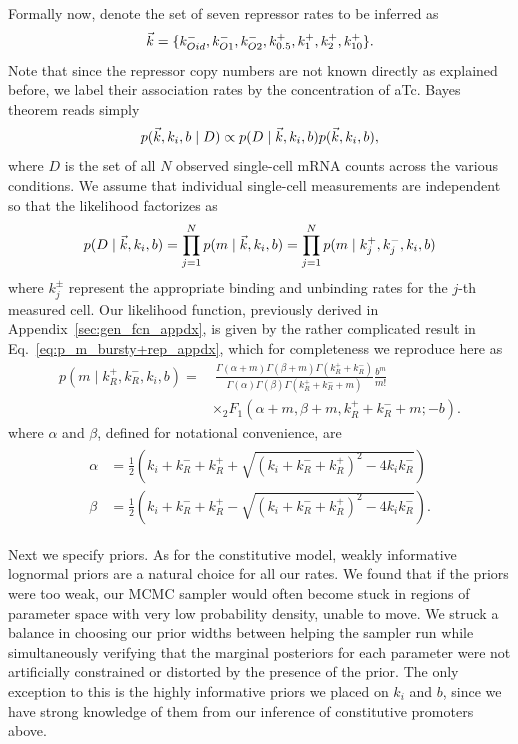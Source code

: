 Formally now, denote the set of seven repressor rates to be inferred as
\begin{equation}
\vec{k} =\{k_{Oid}^-, k_{O1}^-, k_{O2}^-,
k_{0.5}^+, k_{1}^+, k_{2}^+, k_{10}^+\}.
\end{equation}
Note that since the repressor copy numbers are not known directly as explained
before, we label their association rates by the concentration of aTc. Bayes
theorem reads simply
\begin{equation}
p(\vec{k}, k_i, b \mid D)
\propto
p(D \mid\vec{k}, k_i, b) p(\vec{k}, k_i, b),
\end{equation}
where $D$ is the set of all $N$ observed single-cell mRNA counts across the
various conditions. We assume that individual single-cell measurements are
independent so that the likelihood factorizes as
\begin{equation}
p(D \mid\vec{k}, k_i, b)
= \prod_{j=1}^N p(m\mid \vec{k}, k_i, b)
= \prod_{j=1}^N p(m\mid k_j^+, k_j^-, k_i, b)
\end{equation}
where $k_j^\pm$ represent the appropriate binding and unbinding rates for the
$j$-th measured cell. Our likelihood function, previously derived in
Appendix~\ref{sec:gen_fcn_appdx}, is given by the rather complicated result in
Eq.~\ref{eq:p_m_bursty+rep_appdx}, which for completeness we reproduce here as
\begin{equation}
\begin{split}
p(m \mid k_R^+, k_R^-, k_i, b) = & ~\frac{
        \Gamma(\alpha + m)\Gamma(\beta + m)\Gamma(k_R^+ + k_R^-)
        }
        {
        \Gamma(\alpha)\Gamma(\beta)\Gamma(k_R^+ + k_R^- + m)
        }
\frac{b^m}{m!}
\\
&\times {_2F_1}(\alpha+m, \beta+m, k_R^++k_R^-+m; -b).
\end{split}
\label{eq:p_m_bursty+rep_infreprint}
\end{equation}
where $\alpha$ and $\beta$, defined for notational convenience, are
\begin{align}
\begin{split}
\alpha &= \frac{1}{2}
\left(k_i+k_R^-+k_R^+ + \sqrt{(k_i+k_R^-+k_R^+)^2 - 4k_i k_R^-}\right)
\\
\beta &= \frac{1}{2}
\left(k_i+k_R^-+k_R^+ - \sqrt{(k_i+k_R^-+k_R^+)^2 - 4k_i k_R^-}\right).
\end{split}
\end{align}

Next we specify priors. As for the constitutive model, weakly informative
lognormal priors are a natural choice for all our rates. We found that if the
priors were too weak, our MCMC sampler would often become stuck in regions of
parameter space with very low probability density, unable to move. We struck a
balance in choosing our prior widths between helping the sampler run while
simultaneously verifying that the marginal posteriors for each parameter were
not artificially constrained or distorted by the presence of the prior. The only
exception to this is the highly informative priors we placed on $k_i$ and $b$,
since we have strong knowledge of them from our inference of constitutive
promoters above.

